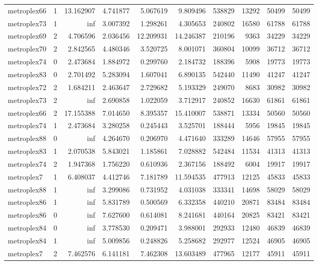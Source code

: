 \begin{longtable}{|l|r|r|r|r|r|r|r|r|r|}
metroplex66 & 1 & 13.162907 & 4.741877 & 5.067619 & 9.809496 & 538829 & 13292 & 50499 & 50499 \\
metroplex73 & 1 & inf & 3.007392 & 1.298261 & 4.305653 & 240802 & 16580 & 61788 & 61788 \\
metroplex69 & 2 & 4.706596 & 2.036456 & 12.209931 & 14.246387 & 210196 & 9363 & 34229 & 34229 \\
metroplex70 & 2 & 2.842565 & 4.480346 & 3.520725 & 8.001071 & 360804 & 10099 & 36712 & 36712 \\
metroplex74 & 0 & 2.473684 & 1.884972 & 0.299760 & 2.184732 & 188396 & 5908 & 19773 & 19773 \\
metroplex83 & 0 & 2.701492 & 5.283094 & 1.607041 & 6.890135 & 542440 & 11490 & 41247 & 41247 \\
metroplex72 & 2 & 1.684211 & 2.463647 & 2.729682 & 5.193329 & 249070 & 8683 & 30982 & 30982 \\
metroplex73 & 2 & inf & 2.690858 & 1.022059 & 3.712917 & 240852 & 16630 & 61861 & 61861 \\
metroplex66 & 2 & 17.155388 & 7.014650 & 8.395357 & 15.410007 & 538871 & 13334 & 50560 & 50560 \\
metroplex74 & 1 & 2.473684 & 3.280258 & 0.245443 & 3.525701 & 188444 & 5956 & 19845 & 19845 \\
metroplex88 & 0 & inf & 4.264670 & 0.206970 & 4.471640 & 333289 & 14646 & 57955 & 57955 \\
metroplex83 & 1 & 2.070538 & 5.843021 & 1.185861 & 7.028882 & 542484 & 11534 & 41313 & 41313 \\
metroplex74 & 2 & 1.947368 & 1.756220 & 0.610936 & 2.367156 & 188492 & 6004 & 19917 & 19917 \\
metroplex7 & 1 & 6.408037 & 4.412746 & 7.181789 & 11.594535 & 477913 & 12125 & 45833 & 45833 \\
metroplex88 & 1 & inf & 3.299086 & 0.731952 & 4.031038 & 333341 & 14698 & 58029 & 58029 \\
metroplex86 & 1 & inf & 5.831789 & 0.500569 & 6.332358 & 440210 & 20871 & 83484 & 83484 \\
metroplex86 & 0 & inf & 7.627600 & 0.614081 & 8.241681 & 440164 & 20825 & 83421 & 83421 \\
metroplex84 & 0 & inf & 3.778530 & 0.209471 & 3.988001 & 292933 & 12480 & 46839 & 46839 \\
metroplex84 & 1 & inf & 5.009856 & 0.248826 & 5.258682 & 292977 & 12524 & 46905 & 46905 \\
metroplex7 & 2 & 7.462576 & 6.141181 & 7.462308 & 13.603489 & 477965 & 12177 & 45911 & 45911 \\

\end{longtable}
